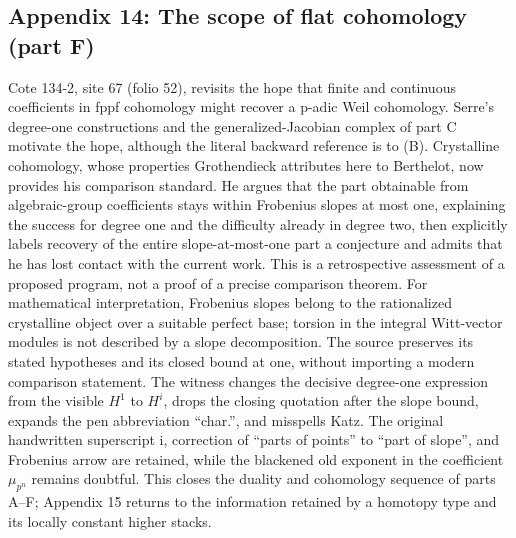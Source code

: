 \subsection*{Appendix 14: The scope of flat cohomology (part F)}
Cote 134-2, site 67 (folio 52), revisits the hope that finite and continuous coefficients in fppf cohomology might recover a p-adic Weil cohomology. Serre's degree-one constructions and the generalized-Jacobian complex of part C motivate the hope, although the literal backward reference is to (B). Crystalline cohomology, whose properties Grothendieck attributes here to Berthelot, now provides his comparison standard. He argues that the part obtainable from algebraic-group coefficients stays within Frobenius slopes at most one, explaining the success for degree one and the difficulty already in degree two, then explicitly labels recovery of the entire slope-at-most-one part a conjecture and admits that he has lost contact with the current work. This is a retrospective assessment of a proposed program, not a proof of a precise comparison theorem. For mathematical interpretation, Frobenius slopes belong to the rationalized crystalline object over a suitable perfect base; torsion in the integral Witt-vector modules is not described by a slope decomposition. The source preserves its stated hypotheses and its closed bound at one, without importing a modern comparison statement. The witness changes the decisive degree-one expression from the visible $H^1$ to $H^i$, drops the closing quotation after the slope bound, expands the pen abbreviation ``char.'', and misspells Katz. The original handwritten superscript i, correction of ``parts of points'' to ``part of slope'', and Frobenius arrow are retained, while the blackened old exponent in the coefficient $\mu_{p^n}$ remains doubtful. This closes the duality and cohomology sequence of parts A--F; Appendix 15 returns to the information retained by a homotopy type and its locally constant higher stacks.


